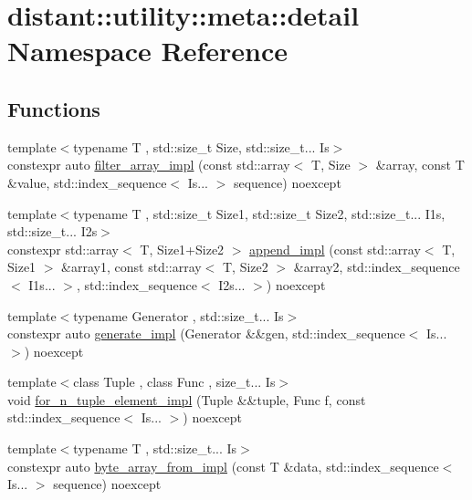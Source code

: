 \hypertarget{namespacedistant_1_1utility_1_1meta_1_1detail}{}\section{distant\+:\+:utility\+:\+:meta\+:\+:detail Namespace Reference}
\label{namespacedistant_1_1utility_1_1meta_1_1detail}
\subsection*{Functions}
\begin{DoxyCompactItemize}
\item 
{\footnotesize template$<$typename T , std\+::size\+\_\+t Size, std\+::size\+\_\+t... Is$>$ }\\constexpr auto \mbox{\hyperlink{namespacedistant_1_1utility_1_1meta_1_1detail_a07a14d1e5acba0c5d9c3c746051c489a}{filter\+\_\+array\+\_\+impl}} (const std\+::array$<$ T, Size $>$ \&array, const T \&value, std\+::index\+\_\+sequence$<$ Is... $>$ sequence) noexcept
\item 
{\footnotesize template$<$typename T , std\+::size\+\_\+t Size1, std\+::size\+\_\+t Size2, std\+::size\+\_\+t... I1s, std\+::size\+\_\+t... I2s$>$ }\\constexpr std\+::array$<$ T, Size1+Size2 $>$ \mbox{\hyperlink{namespacedistant_1_1utility_1_1meta_1_1detail_a82eef55cdc38f07164682ad05619ffe2}{append\+\_\+impl}} (const std\+::array$<$ T, Size1 $>$ \&array1, const std\+::array$<$ T, Size2 $>$ \&array2, std\+::index\+\_\+sequence$<$ I1s... $>$, std\+::index\+\_\+sequence$<$ I2s... $>$) noexcept
\item 
{\footnotesize template$<$typename Generator , std\+::size\+\_\+t... Is$>$ }\\constexpr auto \mbox{\hyperlink{namespacedistant_1_1utility_1_1meta_1_1detail_a914f9cdfce593fb74157a09dd74ccf33}{generate\+\_\+impl}} (Generator \&\&gen, std\+::index\+\_\+sequence$<$ Is... $>$) noexcept
\item 
{\footnotesize template$<$class Tuple , class Func , size\+\_\+t... Is$>$ }\\void \mbox{\hyperlink{namespacedistant_1_1utility_1_1meta_1_1detail_a314d6d0eb98dbf7f4e15debd37d9050f}{for\+\_\+n\+\_\+tuple\+\_\+element\+\_\+impl}} (Tuple \&\&tuple, Func f, const std\+::index\+\_\+sequence$<$ Is... $>$) noexcept
\item 
{\footnotesize template$<$typename T , std\+::size\+\_\+t... Is$>$ }\\constexpr auto \mbox{\hyperlink{namespacedistant_1_1utility_1_1meta_1_1detail_a4382d186581307ddda4aaa043514844b}{byte\+\_\+array\+\_\+from\+\_\+impl}} (const T \&data, std\+::index\+\_\+sequence$<$ Is... $>$ sequence) noexcept

\end{DoxyCompactItemize}
